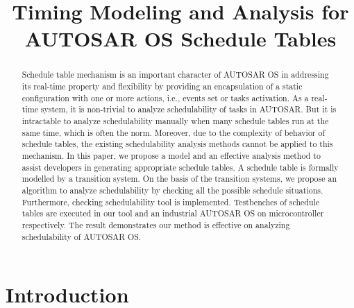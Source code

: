 \documentclass[10pt,conference]{IEEEtran}
\begin{document}
\title{Timing Modeling and Analysis for AUTOSAR OS Schedule Tables}

\author{
}
\maketitle
\begin{abstract}
Schedule table mechanism is an important character of AUTOSAR OS in addressing its real-time property and flexibility by providing an encapsulation of a static configuration with one or more actions, i.e., events set or tasks activation. As a real-time system, it is non-trivial to analyze schedulability of tasks in AUTOSAR. But it is intractable to analyze schedulability manually when many schedule tables run at the same time, which is often the norm. Moreover, due to the complexity of behavior of schedule tables, the existing schedulability analysis methods cannot be applied to this mechanism. In this paper, we propose a model and an effective analysis method to assist developers in generating appropriate schedule tables. %
A schedule table is formally modelled by a transition system. On the basis of the transition systems, we propose an algorithm to analyze schedulability by checking all the possible schedule situations. Furthermore, checking schedulability tool is implemented. Testbenches of schedule tables are executed in our tool and an industrial AUTOSAR OS on microcontroller respectively. The result demonstrates our method is effective on analyzing schedulability of AUTOSAR OS.
\end{abstract}
\IEEEpeerreviewmaketitle
\section{Introduction}
\end{document}
